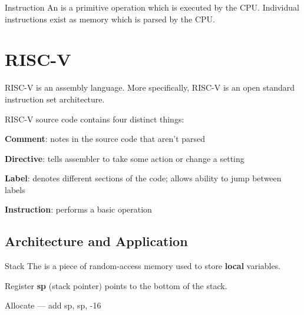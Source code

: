 \documentclass[12pt]{report}
\begin{document}
\begin{dfnbox}{Instruction}
	An  is a primitive operation which is executed by the CPU. Individual instructions exist as memory which is parsed by the CPU.
\end{dfnbox}

\newpage
\chapter{RISC-V}
\begin{dfnbox}{RISC-V}  is an assembly language. More specifically, RISC-V is an open standard instruction set architecture.
	
	RISC-V source code contains four distinct things:
	\begin{dfnitems}
		\item \textbf{Comment}: notes in the source code that aren't parsed
		\item \textbf{Directive}:  tells assembler to take some action or change a setting
		\item \textbf{Label}: denotes different sections of the code; allows ability to jump between labels
		\item \textbf{Instruction}: performs a basic operation
	\end{dfnitems}
\end{dfnbox}

\section{Architecture and Application}

\begin{dfnbox}{Stack}
	The  is a piece of random-access memory used to store \textbf{local} variables.
	
	Register \textbf{sp} (stack pointer) points to the bottom of the stack.
	\begin{dfnitems}
		\item Allocate --- add sp, sp, -16
		\item 
	\end{dfnitems}
\end{dfnbox}
\end{document}

